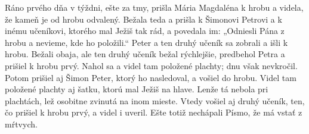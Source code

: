 Ráno prvého dňa v týždni, ešte za tmy, prišla Mária Magdaléna k hrobu a videla, že kameň je od hrobu odvalený. 
Bežala teda a prišla k Šimonovi Petrovi a k inému učeníkovi, ktorého mal Ježiš tak rád, a povedala im: „Odniesli Pána z hrobu a nevieme, kde ho položili.“ 
\versseparator
Peter a ten druhý učeník sa zobrali a išli k hrobu. Bežali obaja, ale ten druhý učeník bežal rýchlejšie, predbehol Petra a prišiel k hrobu prvý.
Nahol sa a videl tam položené plachty; dnu však nevkročil. 
\versseparator
Potom prišiel aj Šimon Peter, ktorý ho nasledoval, a vošiel do hrobu. Videl tam položené plachty aj šatku, ktorú mal Ježiš na hlave. Lenže tá nebola pri plachtách, lež osobitne zvinutá na inom mieste. 
\versseparator
Vtedy vošiel aj druhý učeník, ten, čo prišiel k hrobu prvý, a videl i uveril.
Ešte totiž nechápali Písmo, že má vstať z mŕtvych. 